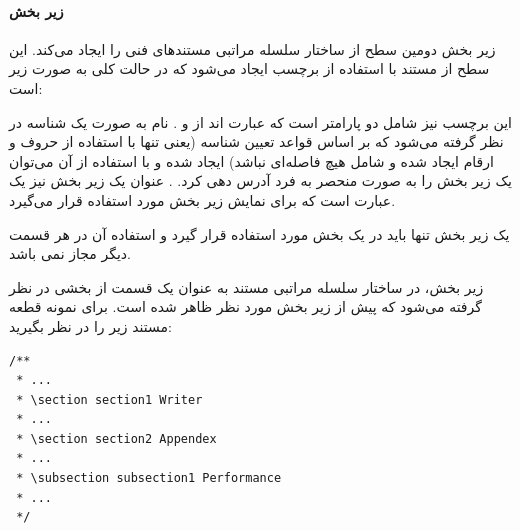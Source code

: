 \paragraph{زیر بخش}

زیر بخش دومین سطح از ساختار سلسله مراتبی مستندهای فنی را
ایجاد می‌کند. این سطح از مستند با استفاده از برچسب  ایجاد می‌شود
که در حالت کلی به صورت زیر است:


این برچسب نیز شامل دو پارامتر است که عبارت اند از  و
. نام به صورت یک شناسه در نظر گرفته می‌شود که بر اساس قواعد
تعیین شناسه (یعنی تنها با استفاده از حروف و ارقام ایجاد شده و شامل هیچ فاصله‌ای
نباشد) ایجاد شده و با استفاده از آن می‌توان یک زیر بخش را به صورت منحصر به فرد
آدرس دهی کرد.
. عنوان یک زیر بخش نیز یک عبارت است که برای نمایش زیر بخش مورد استفاده قرار
می‌گیرد.

\begin{warning}
یک زیر بخش تنها باید در یک بخش مورد استفاده قرار گیرد و استفاده آن در هر قسمت
دیگر مجاز نمی باشد.
\end{warning}

زیر بخش، در ساختار سلسله مراتبی مستند به عنوان یک قسمت از بخشی در نظر گرفته
می‌شود که پیش از زیر بخش مورد نظر ظاهر شده است. برای نمونه قطعه مستند زیر را در
نظر بگیرید:

\begin{latin}
\lstset{language=C++}  
\begin{lstlisting}[frame=single] 
/**
 * ...
 * \section section1 Writer
 * ...
 * \section section2 Appendex
 * ...
 * \subsection subsection1 Performance
 * ...
 */
\end{lstlisting}
\end{latin}

